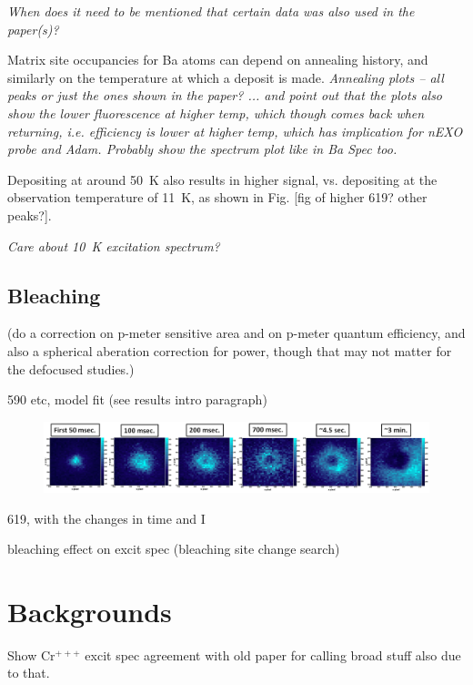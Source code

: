 \emph{\color{gray}When does it need to be mentioned that certain data was also used in the paper(s)?}

Matrix site occupancies for Ba atoms can depend on annealing history, and similarly on the temperature at which a deposit is made.  \emph{\color{gray}Annealing plots -- all peaks or just the ones shown in the paper? ... and point out that the plots also show the lower fluorescence at higher temp, which though comes back when returning, i.e. efficiency is lower at higher temp, which has implication for nEXO probe and Adam.  Probably show the spectrum plot like in Ba Spec too.}

Depositing at around 50~K also results in higher signal, vs. depositing at the observation temperature of 11~K, as shown in Fig. [fig of higher 619? other peaks?].

\emph{\color{gray}Care about 10~K excitation spectrum?}

\subsection{Bleaching}
\label{subsec:bleaching}

({\color{red}do a correction on p-meter sensitive area and on p-meter quantum efficiency, and also a spherical aberation correction for power, though that may not matter for the defocused studies.})

590 etc, model fit (see results intro paragraph)

\begin{figure} %
        \centering
                \includegraphics[width=.9\textwidth]{figures/hole_bleach_590.png}
                \caption{}
\label{fig:testfig}
\end{figure}

619, with the changes in time and I

bleaching effect on excit spec (bleaching site change search)

\section{Backgrounds}
\label{sec:bgs}

Show Cr$^{+++}$ excit spec agreement with old paper for calling broad stuff also due to that.

